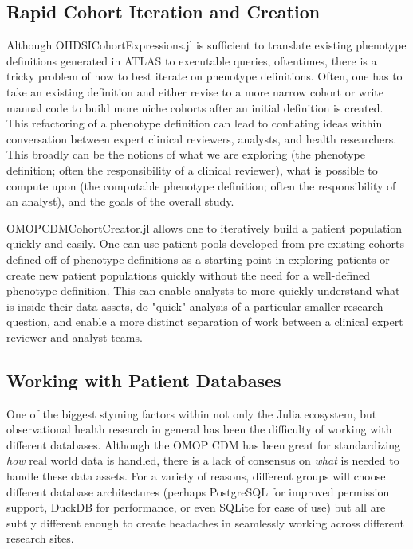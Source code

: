 \documentclass{juliacon}
\begin{document}
\subsection{Rapid Cohort Iteration and Creation}

Although OHDSICohortExpressions.jl is sufficient to translate existing phenotype definitions generated in ATLAS to executable queries, oftentimes, there is a tricky problem of how to best iterate on phenotype definitions. \cite{zelkoDevelopingRobustComputable2023}
Often, one has to take an existing definition and either revise to a more narrow cohort or write manual code to build more niche cohorts after an initial definition is created.
This refactoring of a phenotype definition can lead to conflating ideas within conversation between expert clinical reviewers, analysts, and health researchers.
This broadly can be the notions of what we are exploring (the phenotype definition; often the responsibility of a clinical reviewer), what is possible to compute upon (the computable phenotype definition; often the responsibility of an analyst), and the goals of the overall study.

OMOPCDMCohortCreator.jl allows one to iteratively build a patient population quickly and easily.
One can use patient pools developed from pre-existing cohorts defined off of phenotype definitions as a starting point in exploring patients or create new patient populations quickly without the need for a well-defined phenotype definition.
This can enable analysts to more quickly understand what is inside their data assets, do "quick" analysis of a particular smaller research question, and enable a more distinct separation of work between a clinical expert reviewer and analyst teams.

\subsection{Working with Patient Databases}

One of the biggest styming factors within not only the Julia ecosystem, but observational health research in general has been the difficulty of working with different databases.\cite{zelko2023julia}
Although the OMOP CDM has been great for standardizing \textit{how} real world data is handled, there is a lack of consensus on \textit{what} is needed to handle these data assets.
For a variety of reasons, different groups will choose different database architectures (perhaps PostgreSQL for improved permission support, DuckDB for performance, or even SQLite for ease of use) but all are subtly different enough to create headaches in seamlessly working across different research sites.
\end{document}
